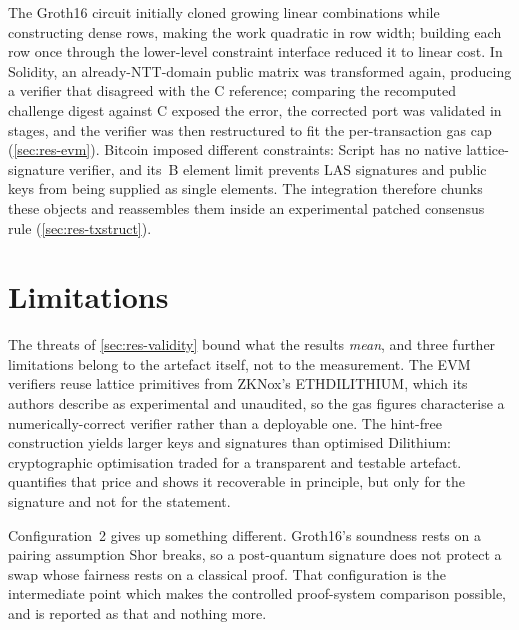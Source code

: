 The Groth16 circuit initially cloned growing linear combinations while constructing dense
rows, making the work quadratic in row width; building each row once through the
lower-level constraint interface reduced it to linear cost. In Solidity, an
already-NTT-domain public matrix was transformed again, producing a verifier that disagreed
with the C reference; comparing the recomputed challenge digest against C exposed the
error, the corrected port was validated in stages, and the verifier was then restructured
to fit the per-transaction gas cap (\cref{sec:res-evm}). Bitcoin imposed different
constraints: Script has no native lattice-signature verifier, and its \btcChunkWidth\,B
element limit prevents LAS signatures and public keys from being supplied as single
elements. The integration therefore chunks these objects and reassembles them inside an
experimental patched consensus rule (\cref{sec:res-txstruct}).

\section{Limitations}
\label{sec:eval-limitations}

The threats of \cref{sec:res-validity} bound what the results \emph{mean}, and three further
limitations belong to the artefact itself, not to the measurement. The EVM verifiers reuse
lattice primitives from ZKNox's ETHDILITHIUM, which its authors describe as experimental
and unaudited, so the gas
figures characterise a numerically-correct verifier rather than a deployable one. The
hint-free
construction yields larger keys and signatures than optimised Dilithium: cryptographic
optimisation traded for a transparent and testable artefact. 
quantifies that price and shows it recoverable in principle, but only for the signature
and not for the statement.

Configuration~2 gives up something different. Groth16's soundness rests on a pairing
assumption Shor breaks, so a post-quantum signature does not protect a swap whose fairness
rests on a classical proof. That configuration is the intermediate point which makes the
controlled proof-system comparison possible, and is reported as that and nothing more.
